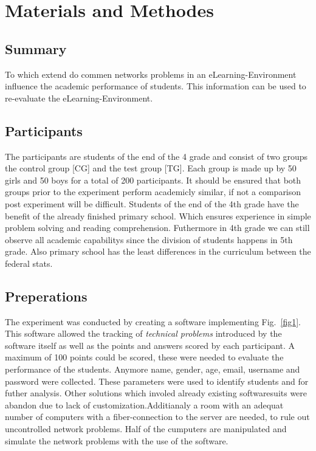 \documentclass[runningheads]{llncs}
\begin{document}
\section{Materials and Methodes}
\subsection{Summary}
To which extend do commen networks problems in an eLearning-Environment
influence the academic performance of students. This information can be used to
re-evaluate the eLearning-Environment. 

\subsection{Participants}
The participants are students of the end of the 4 grade and consist of two groups the control group [CG] and
the test group [TG]. Each group is made up by 50 girls and 50 boys for a total of 200 participants.
It should be ensured that both groups prior to the experiment perform academicly similar, if not a
comparison post experiment will be difficult. Students of the end of the 4th grade have the benefit of the
already finished primary school. Which ensures experience in simple problem solving and
reading comprehension. Futhermore in 4th grade we can still observe all academic capabilitys
since the division of students happens in 5th grade. Also primary school has the least differences
in the curriculum between the federal stats.


\subsection{Preperations}
The experiment was conducted by creating a software implementing Fig.~\ref{fig1}.
This software\cite{ref_soft} allowed the tracking of {\itshape technical problems} introduced by
the software itself as well as the points and answers scored by each participant.
A maximum of 100 points could be scored, these were needed to evaluate the performance of
the students. Anymore name, gender, age, email, username and password were collected.
These parameters were used to identify students and for futher analysis.
Other solutions which involed already existing softwaresuits were abandon due to lack
of customization.Additianaly a room with an adequat number of computers with a fiber-connection
to the server are needed, to rule out uncontrolled network problems.
Half of the cumputers are manipulated and simulate the network problems with the
use of the software.
\end{document}
